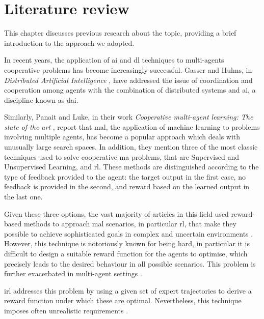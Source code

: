 \setcounter{chapter}{0}
\chapter{Literature review}
\label{chap:stateoftheart}
This chapter discusses previous research about the topic, providing a brief 
introduction to the approach we adopted.


\bigskip
In recent years, the application of \gls{ai} and \gls{dl} techniques to multi-agents 
cooperative problems has become increasingly successful.
Gasser and Huhns, in \emph{Distributed Artificial Intelligence} 
\cite[][]{gasser2014distributed}, have addressed the issue of coordination and 
cooperation among agents with the combination of distributed systems and 
\gls{ai}, a discipline known as \gls{dai}. 

Similarly, Panait and Luke, in their work \emph{Cooperative multi-agent learning: 
The state of the art} \cite[][]{panait2005cooperative}, report that \gls{mal}, the 
application of machine learning to problems involving multiple agents, has 
become a popular approach which deals with unusually large search spaces. 
In addition, they mention three of the most classic techniques used to solve 
cooperative \gls{ma} problems, that are Supervised and Unsupervised Learning, 
and \gls{rl}. These methods are distinguished according to the type of feedback 
provided to the agent: the target output in the first case, no feedback is provided 
in the second, and reward based on the learned output in the last one.

Given these three options, the vast majority of articles in this field used 
reward-based methods to approach \gls{mal} scenarios, in particular \gls{rl}, that 
make they possible to achieve sophisticated goals in complex and uncertain 
environments \cite[][]{oliehoek2012decentralised}. 
However, this technique is notoriously known for being hard, in particular it is 
difficult to design a suitable reward function for the agents to optimise, which 
precisely leads to the desired behaviour in all possible scenarios. This problem is 
further exacerbated in multi-agent settings \cite[][]{hadfield2017inverse, 
oliehoek2012decentralised}.

\gls{irl} addresses this problem by using a given set of expert trajectories to 
derive a reward function under which these are optimal. 
Nevertheless, this technique imposes often unrealistic requirements 
\cite[][]{vsovsic2016inverse}.

